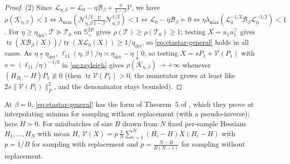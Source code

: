 \documentclass[11pt]{article}
\theoremstyle{remark}
\newcommand{\tr}{\operatorname{tr}}
\begin{document}
\begin{proof}
(2) Since $\mathcal L_{\eta,\beta} = \mathcal L_0 - \eta\mathcal B_\beta + \frac{\eta}{1-\beta}\mathcal V$, we have $\rho(\mathcal K_{\eta,\beta}) < 1 \iff \lambda_{\max}(\mathcal N_{\eta,\beta}^{1/2}\frac{\mathcal V}{1-\beta}\mathcal N_{\eta,\beta}^{1/2}) < 1 \iff \mathcal L_0 - \eta\mathcal B_\beta \succ 0 \iff \eta\lambda_{\max}(\mathcal L_0^{-1/2}\mathcal B_\beta\mathcal L_0^{-1/2}) < 1$. For $\eta \ge \eta_{\mathrm{det}}$, $\mathcal T \succeq \mathcal T_0$ on $\mathbb S^{2P}_+$ gives $\rho(\mathcal T) \ge \rho(\mathcal T_0) \ge 1$; testing $X = u_1 u_1^\top$ gives $\tr(X\mathcal B_\beta(X))/\tr(X\mathcal L_0(X)) \ge 1/\eta_{\mathrm{det}}$, so \eqref{eq:etastar-general} holds in all cases. As $\eta \uparrow \eta_{\mathrm{det}}$, $\ell_{11}(\eta,\beta)/\eta \asymp \eta_{\mathrm{det}} - \eta \downarrow 0$, so testing $X = s P_1 + \mathcal V(P_1)$ with $s=(\ell_{11}/\eta)^{-1/3}$ in \eqref{eq:rayleigh} gives $\rho(\mathcal K_{\eta,\beta}) \to +\infty$ whenever $(H_{B_t}-H)P_1 \not\equiv 0$ (then $\tr\mathcal V(P_1)>0$, the numerator grows at least like $2s\|\mathcal V(P_1)\|_F^2$, and the denominator stays bounded).
\end{proof}

At $\beta = 0$, \eqref{eq:etastar-general} has the form of Theorem~5 of \citet{mulayoff2024exact}, which they prove at interpolating minima for sampling without replacement (with a pseudo-inverse); here $H\succ0$. For minibatches of size $B$ drawn from $N$ fixed per-sample Hessians $H_1,\dots,H_N$ with mean $H$, $\mathcal V(X) = p\,\frac{1}{N}\sum_{i=1}^N (H_i-H)X(H_i-H)$ with $p = 1/B$ for sampling with replacement and $p = \frac{N-B}{B(N-1)}$ for sampling without replacement.
\end{document}
